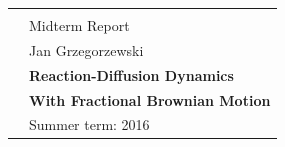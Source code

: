 \documentclass[
  a4paper,BCOR10mm,oneside,
  bibtotoc,idxtotoc,
  headsepline,footsepline,%
  fleqn,openbib
]{scrbook}
\begin{document}
\frontmatter%
\begin{titlepage}
  \raggedright%
  \null%
  \thispagestyle{empty}
  \vspace{4\baselineskip}
  \begin{tabular}{|ll@{}}
    & \\[\baselineskip]
    & \large Midterm Report\\
    & \large Jan Grzegorzewski \\[\baselineskip]
    & \huge\textbf{Reaction-Diffusion Dynamics} \\
    & \huge\textbf{With Fractional Brownian Motion}\\[\baselineskip]
    & \large Summer term: 2016\\[2\baselineskip]
  \end{tabular}
\end{titlepage}

\tableofcontents
\listoffigures

\mainmatter
{}
\printnomenclature
\clearpage

\newtheorem{mydef}{Definition}
\newcommand{\norm}[1]{\left\lVert#1\right\rVert}
\end{document}
